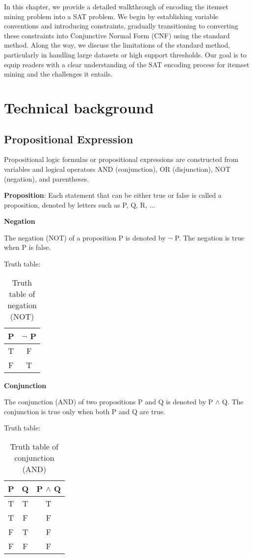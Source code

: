 In this chapter, we provide a detailed walkthrough of encoding the itemset mining problem into a SAT problem.
We begin by establishing variable conventions and introducing constraints, gradually transitioning to converting these constraints into Conjunctive Normal Form (CNF) using the standard method.
Along the way, we discuss the limitations of the standard method, particularly in handling large datasets or high support thresholds.
Our goal is to equip readers with a clear understanding of the SAT encoding process for itemset mining and the challenges it entails.

\section{Technical background}
\subsection{Propositional Expression}
Propositional logic formulas or propositional expressions are constructed from variables
and logical operators AND (conjunction), OR (disjunction), NOT (negation), and
parentheses.

\textbf{Proposition}: Each statement that can be either true or false is called a proposition,
denoted by letters such as P, Q, R, ...

\textbf{Negation}

The negation (NOT) of a proposition P is denoted by $\lnot$ P. The negation
is true when P is false.

Truth table:
\begin{table}[H]
    \centering
    \caption{Truth table of negation (NOT)}
    \label{tab:truth_table_negation}
    \begin{tabular}{|c|c|}
        \hline
        P & $\lnot$ P \\
        \hline
        T & F         \\
        F & T         \\
        \hline
    \end{tabular}
\end{table}

\textbf{Conjunction}

The conjunction (AND) of two propositions P and Q is denoted by P
$\land$ Q. The conjunction is true only when both P and Q are true.

Truth table:
\begin{table}[H]
    \centering
    \caption{Truth table of conjunction (AND)}
    \label{tab:truth_table_conjunction}
    \begin{tabular}{|c|c|c|}
        \hline
        P & Q & P $\land$ Q \\
        \hline
        T & T & T           \\
        T & F & F           \\
        F & T & F           \\
        F & F & F           \\
        \hline
    \end{tabular}
\end{table}

